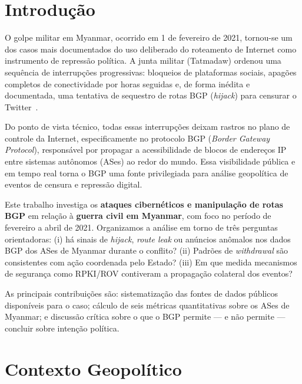 \documentclass[12pt]{article}
\begin{document}
\section{Introdução}

O golpe militar em Myanmar, ocorrido em 1\textordmasculine{} de fevereiro de 2021,
tornou-se um dos casos mais documentados do uso deliberado do roteamento de
Internet como instrumento de repressão política. A junta militar (Tatmadaw)
ordenou uma sequência de interrupções progressivas: bloqueios de plataformas
sociais, apagões completos de conectividade por horas seguidas e, de forma
inédita e documentada, uma tentativa de sequestro de rotas BGP
(\textit{hijack}) para censurar o Twitter~\cite{ooni:multiperspective}.

Do ponto de vista técnico, todas essas interrupções deixam rastros no plano de
controle da Internet, especificamente no protocolo BGP
(\textit{Border Gateway Protocol}), responsável por propagar a acessibilidade
de blocos de endereços IP entre sistemas autônomos (ASes) ao redor do mundo.
Essa visibilidade pública e em tempo real torna o BGP uma fonte privilegiada
para análise geopolítica de eventos de censura e repressão digital.

Este trabalho investiga os \textbf{ataques cibernéticos e
manipulação de rotas BGP} em relação à \textbf{guerra civil em Myanmar}, 
com foco no período de fevereiro a abril de 2021.
Organizamos a análise em torno de três perguntas orientadoras: (i) há sinais
de \textit{hijack}, \textit{route leak} ou anúncios anômalos nos dados BGP
dos ASes de Myanmar durante o conflito? (ii) Padrões de \textit{withdrawal}
são consistentes com ação coordenada pelo Estado? (iii) Em que medida
mecanismos de segurança como RPKI/ROV contiveram a propagação colateral dos
eventos?

As principais contribuições são: sistematização das fontes de dados públicos
disponíveis para o caso; cálculo de seis métricas quantitativas sobre os ASes
de Myanmar; e discussão crítica sobre o que o BGP permite --- e não permite
--- concluir sobre intenção política.


\section{Contexto Geopolítico}
\end{document}
